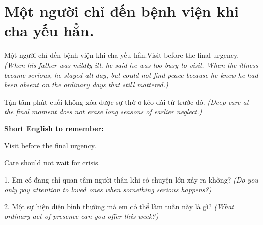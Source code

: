 \section{Một người chỉ đến bệnh viện khi cha yếu hẳn.}
\begin{truyen}{Một người chỉ đến bệnh viện khi cha yếu hẳn.}{Visit before the final urgency.}
\textit{(When his father was mildly ill, he said he was too busy to visit. When the illness became serious, he stayed all day, but could not find peace because he knew he had been absent on the ordinary days that still mattered.)}
\end{truyen}
\begin{baihoc}
Tận tâm phút cuối không xóa được sự thờ ơ kéo dài từ trước đó.
\textit{(Deep care at the final moment does not erase long seasons of earlier neglect.)}
\end{baihoc}
\begin{ghinhoanh}
\textbf{Short English to remember:}

Visit before the final urgency.

Care should not wait for crisis.
\end{ghinhoanh}
\begin{tuhocnhanh}
1. Em có đang chỉ quan tâm người thân khi có chuyện lớn xảy ra không? \textit{(Do you only pay attention to loved ones when something serious happens?)}

2. Một sự hiện diện bình thường mà em có thể làm tuần này là gì? \textit{(What ordinary act of presence can you offer this week?)}
\end{tuhocnhanh}
\ngancach

